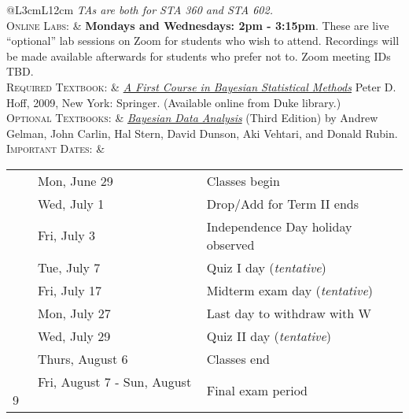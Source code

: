 \documentclass[11pt, a4paper]{article}
\newcommand{\tabitem}{~~\llap{\textbullet}~~}
\begin{document}
\begin{center}
\begin{minipage}[t]{.9\textwidth}
\begin{tabular}{@{}L{3cm}L{12cm}}
			\newline \textit{TAs are both for STA 360 and STA 602.}\\ 
			\textsc{Online Labs:} & \textbf{Mondays and Wednesdays: 2pm - 3:15pm}. These are live ``optional'' lab sessions on Zoom  for students who wish to attend. Recordings will be made available afterwards for students who prefer not to. Zoom meeting IDs TBD. \\
			\textsc{Required Textbook:} & \href{https://find.library.duke.edu/catalog/DUKE004968562}{\textit{A First Course in Bayesian Statistical Methods}} Peter D. Hoff, 2009, New York: Springer. (Available online from Duke library.)\\
			\textsc{Optional Textbooks:}	& \href{http://www.amazon.com/Bayesian-Analysis-Chapman-Statistical-Science/dp/1439840954/}{\textit{Bayesian Data Analysis}} (Third Edition) by Andrew Gelman, John Carlin, Hal Stern, David Dunson, Aki Vehtari, and Donald Rubin. \\
			\textsc{Important Dates:} & \begin{minipage}[t]{.9\textwidth}
				\begin{tabular}{@{}ll}
					\tabitem Mon, June 29 & Classes begin \\
					\tabitem Wed, July 1 & Drop/Add for Term II ends \\
					\tabitem Fri, July 3 & Independence Day holiday observed \\
					\tabitem Tue, July 7 & Quiz I day (\textit{tentative})\\
					\tabitem Fri, July 17 & Midterm exam day (\textit{tentative})\\
					\tabitem Mon, July 27 & Last day to withdraw with W \\
					\tabitem Wed, July 29 & Quiz II day (\textit{tentative})\\
					\tabitem Thurs, August 6 & Classes end \\
					\tabitem Fri, August 7 - Sun, August 9 & Final exam period \\
				\end{tabular}
			\end{minipage} \\
			\bottomrule[0.065cm]
		\end{tabular}
	\end{minipage}
\end{center}





\vspace{.5cm}
\setlength{\unitlength}{1in}
\renewcommand{\arraystretch}{1.5}
\end{document}
